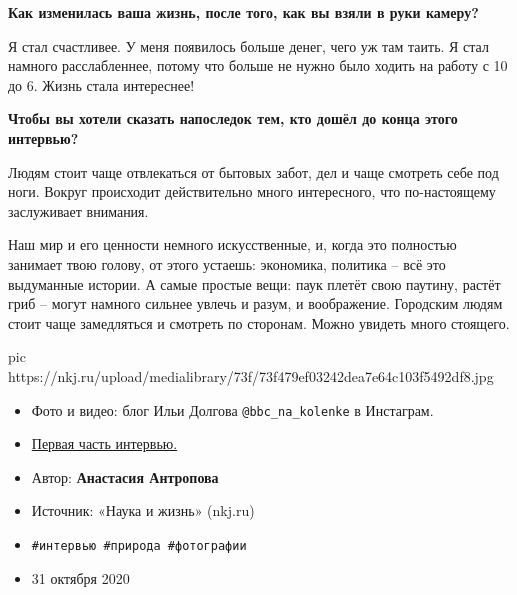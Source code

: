 \textbf{Как изменилась ваша жизнь, после того, как вы взяли в руки камеру?}

Я стал счастливее. У меня появилось больше денег, чего уж там таить. Я стал
намного расслабленнее, потому что больше не нужно было ходить на работу с 10 до
6. Жизнь стала интереснее!

\textbf{Чтобы вы хотели сказать напоследок тем, кто дошёл до конца этого интервью?}

Людям стоит чаще отвлекаться от бытовых забот, дел и чаще смотреть себе под
ноги. Вокруг происходит действительно много интересного, что по-настоящему
заслуживает внимания.

Наш мир и его ценности немного искусственные, и, когда это полностью занимает
твою голову, от этого устаешь: экономика, политика – всё это выдуманные
истории. А самые простые вещи: паук плетёт свою паутину, растёт гриб – могут
намного сильнее увлечь и разум, и воображение. Городским людям стоит чаще
замедляться и смотреть по сторонам. Можно увидеть много стоящего.

\ifcmt
pic https://nkj.ru/upload/medialibrary/73f/73f479ef03242dea7e64c103f5492df8.jpg
\fi

\begin{itemize}
  \item Фото и видео: блог Ильи Долгова \verb|@bbc_na_kolenke| в Инстаграм.
	\item \href{https://www.nkj.ru/open/39683/}{Первая часть интервью.}
	\item Автор: \textbf{Анастасия Антропова}
  \item Источник: «Наука и жизнь» (nkj.ru)
  \item \verb|#интервью #природа #фотографии|
  \item 31 октября 2020
\end{itemize}
